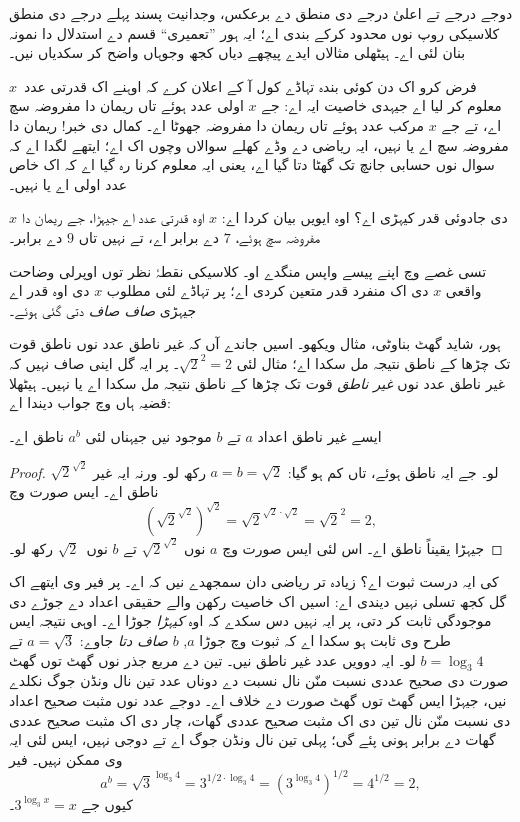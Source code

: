 \documentclass[../../../include/open-logic-section]{subfiles}
\begin{document}


دوجے درجے تے اعلیٰ درجے دی منطق دے
برعکس، وجدانیت پسند پہلے درجے دی منطق
کلاسیکی روپ نوں محدود کرکے بندی اے؛
ایہ ہور ”تعمیری“ قسم دے استدلال دا
نمونہ بنان لئی اے۔ ہیٹھلی مثالاں
ایدے پیچھے دیاں کجھ وجوہاں واضح
کر سکدیاں نیں۔

فرض کرو اک دن کوئی بندہ تہاڈے کول
آ کے اعلان کرے کہ اوہنے اک قدرتی
عدد~$x$ معلوم کر لیا اے جیہدی
خاصیت ایہ اے: جے $x$ اولی عدد
ہوئے تاں ریمان دا مفروضہ سچ اے،
تے جے $x$ مرکب عدد ہوئے تاں
ریمان دا مفروضہ جھوٹا اے۔
کمال دی خبر!{} ریمان دا مفروضہ
سچ اے یا نہیں، ایہ ریاضی دے
وڈے کھلے سوالاں وچوں اک اے؛
ایتھے لگدا اے کہ سوال نوں
حسابی جانچ تک گھٹا دتا گیا
اے، یعنی ایہ معلوم کرنا رہ
گیا اے کہ اک خاص عدد اولی
اے یا نہیں۔

$x$ دی جادوئی قدر کیہڑی اے؟
اوہ ایویں بیان کردا اے:
$x$ اوہ قدرتی عدد اے
جیہڑا، جے ریمان دا
مفروضہ سچ ہوئے، $7$
دے برابر اے، تے نہیں
تاں $9$ دے برابر۔

تسی غصے وچ اپنے پیسے
واپس منگدے او۔ کلاسیکی
نقطۂ نظر توں اوپرلی
وضاحت واقعی $x$ دی
اک منفرد قدر متعین
کردی اے؛ پر تہاڈے
لئی مطلوب $x$ دی
اوہ قدر اے جیہڑی
\emph{صاف صاف} دتی
گئی ہوئے۔

ہور، شاید گھٹ بناوٹی،
مثال ویکھو۔ اسیں
جاندے آں کہ غیر
ناطق عدد نوں ناطق
قوت تک چڑھا کے
ناطق نتیجہ مل
سکدا اے؛ مثال
لئی
$\sqrt{2}^2 = 2$۔
پر ایہ گل اینی
صاف نہیں کہ غیر
ناطق عدد نوں
\emph{غیر ناطق}
قوت تک چڑھا کے
ناطق نتیجہ مل
سکدا اے یا نہیں۔
ہیٹھلا قضیہ ہاں
وچ جواب دیندا اے:

\begin{thm}
ایسے غیر ناطق
اعداد $a$ تے
$b$ موجود نیں
جیہناں لئی
$a^b$ ناطق
اے۔
\end{thm}

\begin{proof}
$\sqrt{2}^{\sqrt{2}}$
لو۔ جے ایہ
ناطق ہوئے، تاں
کم ہو گیا:
$a = b = \sqrt{2}$
رکھ لو۔ ورنہ
ایہ غیر ناطق
اے۔ ایس صورت
وچ
\[
(\sqrt{2}^{\sqrt{2}})^{\sqrt{2}} = \sqrt{2}^{\sqrt{2} \cdot
  \sqrt{2}} = \sqrt{2}^2 = 2,
\]
جیہڑا یقیناً
ناطق اے۔
اس لئی ایس
صورت وچ
$a$ نوں
$\sqrt{2}^{\sqrt{2}}$
تے $b$ نوں~$\sqrt 2$
رکھ لو۔
\end{proof}

کی ایہ درست
ثبوت اے؟
زیادہ تر ریاضی
دان سمجھدے نیں
کہ اے۔ پر
فیر وی ایتھے
اک گل کجھ
تسلی نہیں دیندی
اے: اسیں
اک خاصیت
رکھن والے
حقیقی اعداد
دے جوڑے
دی موجودگی
ثابت کر
دتی، پر
ایہ نہیں
دس سکدے
کہ اوہ
\emph{کیہڑا}
جوڑا اے۔
اوہی نتیجہ
ایس طرح وی
ثابت ہو سکدا
اے کہ ثبوت
وچ جوڑا
$a$, $b$
\emph{صاف
دتا} جاوے:
$a = \sqrt{3}$
تے
$b = \log_3 4$
لو۔
ایہ دوویں عدد غیر ناطق نیں۔ تین دے مربع جذر نوں
گھٹ توں گھٹ صورت دی صحیح عددی نسبت منّن نال
نسبت دے دوناں عدد تین نال ونڈن جوگ نکلدے نیں،
جیہڑا ایس گھٹ توں گھٹ صورت دے خلاف اے۔ دوجے
عدد نوں مثبت صحیح اعداد دی نسبت منّن نال تین دی
اک مثبت صحیح عددی گھات، چار دی اک مثبت صحیح عددی
گھات دے برابر ہونی پئے گی؛ پہلی تین نال ونڈن جوگ
اے تے دوجی نہیں، ایس لئی ایہ وی ممکن نہیں۔ فیر
\[
a^b = \sqrt{3}^{\log_3 4} = 3^{1/2 \cdot \log_3 4} = (3^{\log_3
  4})^{1/2} = 4^{1/2}= 2,
\]
کیوں جے
$3^{\log_3 x} = x$۔
\end{document}
